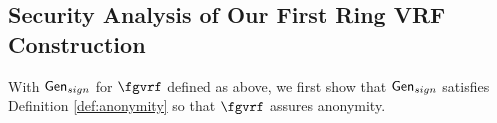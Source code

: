 %	
%	
%

\subsection{Security Analysis of Our First Ring VRF Construction}
With $ \mathsf{Gen}_{sign} $  for $ \fgvrf $ defined as above, we first show that  $ \mathsf{Gen}_{sign} $ satisfies Definition \ref{def:anonymity} so that $ \fgvrf $ assures anonymity. 



%	

